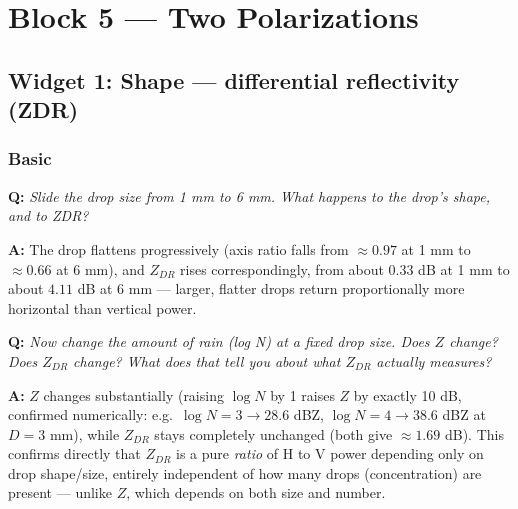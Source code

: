 \documentclass[11pt]{article}
\newenvironment{qa}[1]{\par\noindent\textbf{\color{qgray}Q: }\emph{#1}\par\noindent\textbf{A: }}{\par\vspace{6pt}}
\newcommand{\tier}[1]{\subsubsection*{#1}}
\begin{document}
\section{Block 5 --- Two Polarizations}

\subsection{Widget 1: Shape --- differential reflectivity (ZDR)}

\tier{Basic}
\begin{qa}{Slide the drop size from 1 mm to 6 mm. What happens to the drop's shape, and to ZDR?}
The drop flattens progressively (axis ratio falls from $\approx0.97$ at 1 mm to $\approx0.66$ at 6 mm), and $Z_{DR}$ rises correspondingly, from about $0.33$ dB at 1 mm to about $4.11$ dB at 6 mm --- larger, flatter drops return proportionally more horizontal than vertical power.
\end{qa}
\begin{qa}{Now change the amount of rain (log N) at a fixed drop size. Does $Z$ change? Does $Z_{DR}$ change? What does that tell you about what $Z_{DR}$ actually measures?}
$Z$ changes substantially (raising $\log N$ by 1 raises $Z$ by exactly 10 dB, confirmed numerically: e.g.\ $\log N=3\to28.6$ dBZ, $\log N=4\to38.6$ dBZ at $D=3$ mm), while $Z_{DR}$ stays completely unchanged (both give $\approx1.69$ dB). This confirms directly that $Z_{DR}$ is a pure \emph{ratio} of H to V power depending only on drop shape/size, entirely independent of how many drops (concentration) are present --- unlike $Z$, which depends on both size and number.
\end{qa}
\end{document}

